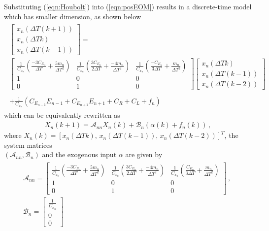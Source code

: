 \documentclass[11pt]{ucthesis}
\begin{document}
Substituting (\ref{eqn:Houbolt}) into (\ref{eqn:posEOM}) results in a discrete-time model which has smaller dimension, as shown below
\begin{eqnarray}
\begin{matrix}
\begin{bmatrix}x_n(\Delta T(k+1))\\x_n(\Delta Tk)\\x_n(\Delta T(k-1))\end{bmatrix} =\\
\begin{bmatrix}
\frac{1}{C_{x_n}}(\frac{-3C_{E_n}}{\Delta T}+\frac{5m_n}{\Delta T^2})&\frac{1}{C_{x_n}}(\frac{3C_{E_n}}{2\Delta T}+\frac{-4m_n}{\Delta T^2})&\frac{1}{C_{x_n}}(\frac{-C_{E_n}}{3\Delta T}+\frac{m_n}{\Delta T^2})\\1&0&0\\0&1&0
\end{bmatrix}
\begin{bmatrix}
x_n(\Delta Tk)\\x_n(\Delta T(k-1))\\x_n(\Delta T(k-2))
\end{bmatrix}
\\\\+ \frac{1}{C_{x_n}}( C_{E_{n-1}}E_{n-1}+C_{E_{n+1}}E_{n+1}+C_R+C_L+f_n)
\end{matrix}
\label{eqn:decent}
\end{eqnarray}
which can be equivalently rewritten as 
\begin{eqnarray}
X_n (k+1) = \mathcal{A}_{nn} X_n (k) + \mathcal{B}_n (\alpha (k) +f_n (k) ) \,,
\label{eqn:dcEOM}
\end{eqnarray}
where $X_n (k) = \left [ x_n(\Delta T k),\, x_n(\Delta T (k-1)),\,x_n(\Delta T(k-2)) \right ]^T$, the system matrices \\$(\mathcal{A}_{nn},\mathcal{B}_n)$ and the exogenous input $\alpha$ are given by
\begin{eqnarray}
\begin{matrix}
\mathcal{A}_{nn} = \begin{bmatrix}
\frac{1}{C_{x_n}}(\frac{-3C_{E_n}}{\Delta T}+\frac{5m_n}{\Delta T^2})&\frac{1}{C_{x_n}}(\frac{3C_{E_n}}{2\Delta T}+\frac{-4m_n}{\Delta T^2})&\frac{1}{C_{x_n}}(\frac{C_{E_n}}{3\Delta T}+\frac{m_n}{\Delta T^2})\\1&0&0\\0&1&0
\end{bmatrix} \,,\;\\
\mathcal{B}_n = 
\begin{bmatrix}
\frac{1}{C_{x_n}}\\0\\0
\end{bmatrix}
\end{matrix}
\end{eqnarray}
\end{document}
